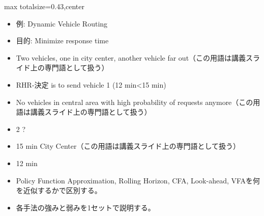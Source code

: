 \clearpage
{}
\begin{minipage}[t]{0.405\textwidth}
\begin{adjustbox}{max totalsize={\textwidth}{0.43\textheight},center}
\begin{minipage}{\textwidth}\scriptsize
{}\begin{itemize}
\item 例: Dynamic Vehicle Routing
\item 目的: Minimize response time
\item Two vehicles, one in city center, another vehicle far out（この用語は講義スライド上の専門語として扱う）
\item RHR-決定 is to send vehicle 1 (12 min<15 min)
\item No vehicles in central area with high probability of requests anymore（この用語は講義スライド上の専門語として扱う）
\item 2 ?
\item 15 min City Center（この用語は講義スライド上の専門語として扱う）
\item 12 min
\end{itemize}\begin{itemize}
\item Policy Function Approximation, Rolling Horizon, CFA, Look-ahead, VFAを何を近似するかで区別する。
\item 各手法の強みと弱みを1セットで説明する。
\end{itemize}
\end{minipage}
\end{adjustbox}
\end{minipage}\hfill
